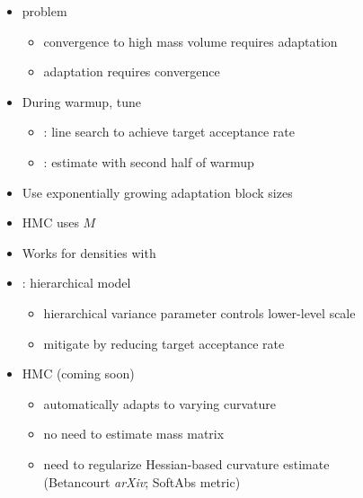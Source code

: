 \documentclass[10pt]{report}
\newcommand{\sld}[1]{\newpage{\noindent\LARGE \ \ \
    \textcolor{MidnightBlue}{\bfseries #1}}\vspace*{4pt}}
\newcommand{\myemph}[1]{{\color{MidnightBlue}{\bfseries #1}}}
\begin{document}
\begin{itemize}
\item \myemph{Chicken-and-egg} problem
\vspace*{-4pt}
\begin{itemize}\small
\item convergence to high mass volume requires adaptation 
\item adaptation requires convergence
\end{itemize}
\item During warmup, tune
\vspace*{-4pt}
\begin{itemize}\small
\item \myemph{step size}: line search to achieve target acceptance
  rate
\item \myemph{mass matrix}: estimate with second half of warmup
\end{itemize}
\item Use exponentially growing adaptation block sizes
\end{itemize}

\sld{Position-Independent Curvature}

\begin{itemize}
\item \myemph{Euclidean} HMC uses \myemph{global mass matrix} $M$
\item Works for densities with \myemph{position-independent curvature}
\item \myemph{Counterexample}: hierarchical model
\vspace*{-4pt}
\begin{itemize}\small
\item hierarchical variance parameter controls lower-level scale
\item mitigate by reducing target acceptance rate
\end{itemize}
\vfill
\item \myemph{Riemannian-manifold} HMC (coming soon)
\vspace*{-4pt}
\begin{itemize}\small
\item automatically adapts to varying curvature
\item no need to estimate mass matrix
\item need to regularize Hessian-based curvature estimate
\\ {\footnotesize (Betancourt {\slshape arXiv}; SoftAbs metric)}
\end{itemize}
\end{itemize}
\end{document}
